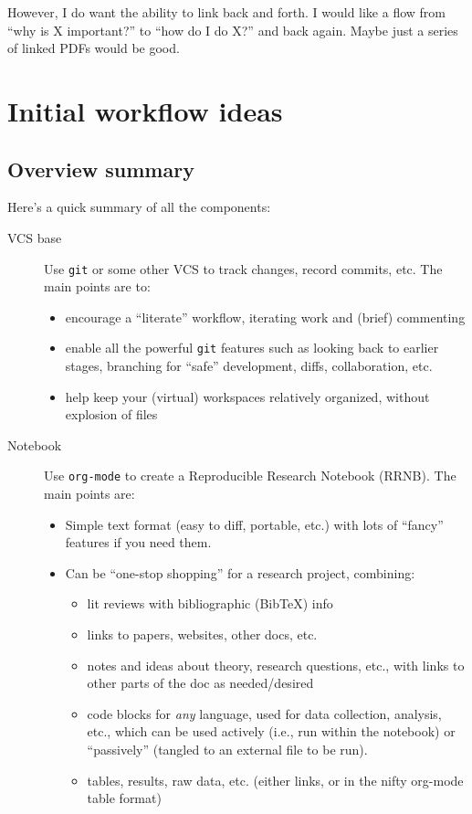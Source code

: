 \documentclass[11pt]{article}
\begin{document}
However, I do want the ability to link back and forth.  I would like a flow from ``why is X important?'' to ``how do I do X?'' and back again. Maybe just a series of linked PDFs would be good.
\section{Initial workflow ideas}
\label{sec-3}
\subsection{Overview summary}
\label{sec-3-1}

Here's a quick summary of all the components:
\begin{description}
\item[VCS base] Use \texttt{git} or some other VCS to track changes, record commits, etc. The main points are to:
\begin{itemize}
\item encourage a ``literate'' workflow, iterating work and (brief) commenting
\item enable all the powerful \texttt{git} features such as looking back to earlier stages, branching for ``safe'' development, diffs, collaboration, etc.
\item help keep your (virtual) workspaces relatively organized, without explosion of files
\end{itemize}
\item[Notebook] Use \texttt{org-mode} to create a Reproducible Research Notebook (RRNB). The main points are:
\begin{itemize}
\item Simple text format (easy to diff, portable, etc.) with lots of ``fancy'' features if you need them.
\item Can be ``one-stop shopping'' for a research project, combining:
\begin{itemize}
\item lit reviews with bibliographic (BibTeX) info
\item links to papers, websites, other docs, etc.
\item notes and ideas about theory, research questions, etc., with links to other parts of the doc as needed/desired
\item code blocks for \emph{any} language, used for data collection, analysis, etc., which can be used actively (i.e., run within the notebook) or ``passively'' (tangled to an external file to be run).
\item tables, results, raw data, etc. (either links, or in the nifty org-mode table format)

\end{itemize}
\end{itemize}
\end{description}
\end{document}
